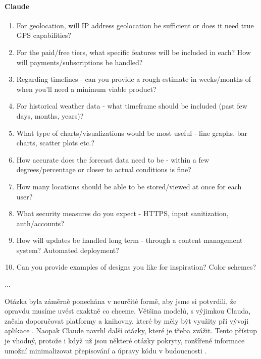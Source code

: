 \documentclass[FM,DP]{tulthesis}
\begin{document}
\begin{tcolorbox}[colback=white,colframe=black]
			\paragraph{Claude}
			\begin{enumerate}
				\item For geolocation, will IP address geolocation be sufficient or does it need true GPS capabilities?
				\item For the paid/free tiers, what specific features will be included in each? How will payments/subscriptions be handled?
				\item Regarding timelines - can you provide a rough estimate in weeks/months of when you'll need a minimum viable product?
				\item For historical weather data - what timeframe should be included (past few days, months, years)?
				\item What type of charts/visualizations would be most useful - line graphs, bar charts, scatter plots etc.?
				\item How accurate does the forecast data need to be - within a few degrees/percentage or closer to actual conditions is fine?
				\item How many locations should be able to be stored/viewed at once for each user?
				\item What security measures do you expect - HTTPS, input sanitization, auth/accounts?
				\item How will updates be handled long term - through a content management system? Automated deployment?
				\item Can you provide examples of designs you like for inspiration? Color schemes? 
			\end{enumerate} 
			... \cite{claude_analyza}
		\end{tcolorbox}
		\vspace{0.6em}
		
		Otázka byla záměrně ponechána v neurčité formě, aby jsme si potvrdili, že opravdu musíme uvést exaktně co chceme. Většina modelů, s výjimkou Clauda, začala doporučovat platformy a knihovny, které by měly být využity při vývoji aplikace \cite{bard_analyza} \cite{bingCopilot_analyza} \cite{chatgpt_analyza} \cite{codellama_analyza} \cite{gitCopilot_analyza}. Naopak Claude navrhl další otázky, které je třeba zvážit. Tento přístup je vhodný, protože i když už jsou některé otázky pokryty, rozšířené informace umožní minimalizovat přepisování a úpravy kódu v budoucnosti \cite{claude_analyza}.
		
\end{document}
